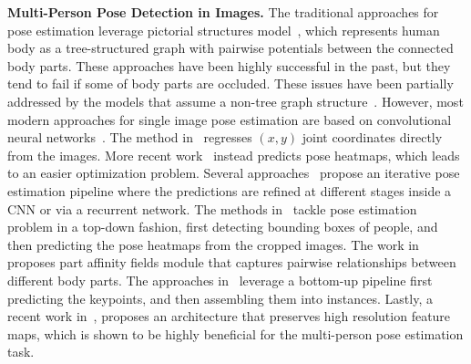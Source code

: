 \documentclass{article}
\begin{document}
\textbf{Multi-Person Pose Detection in Images.} The traditional approaches for pose estimation leverage pictorial structures model~\cite{conf/cvpr/AndrilukaRS09,5540156,BMVC.24.12:abbreviated,DBLP:conf/iccv/PishchulinAGS13,YiYang:2011:APE:2191740.2192012}, which represents human body as a tree-structured graph with pairwise potentials between the connected body parts. These approaches have been highly successful in the past, but they tend to fail if some of body parts are occluded. These issues have been partially addressed by the models that assume a non-tree graph structure~\cite{DGLG13,1541292,Sigal:CVPR:2006,10.1007/978-3-540-88690-7_53}. However, most modern approaches for single image pose estimation are based on convolutional neural networks~\cite{DBLP:journals/corr/ToshevS13,he2017maskrcnn,xiao2018simple,cao2017realtime,DBLP:conf/eccv/NewellYD16,DBLP:conf/cvpr/WeiRKS16,sun2019deep,7780881,NIPS2014_5291,6909696,insafutdinov2016deepercut,pishchulin16cvpr,NIPS2014_5573, DBLP:conf/cvpr/PapandreouZKTTB17}. The method in~\cite{DBLP:journals/corr/ToshevS13} regresses $(x,y)$ joint coordinates directly from the images. More recent work~\cite{DBLP:conf/eccv/NewellYD16} instead predicts pose heatmaps, which leads to an easier optimization problem. Several approaches~\cite{cao2017realtime,DBLP:conf/cvpr/WeiRKS16,7780881,Belagiannis17} propose an iterative pose estimation pipeline where the predictions are refined at different stages inside a CNN or via a recurrent network. The methods in~\cite{he2017maskrcnn,xiao2018simple,DBLP:conf/cvpr/PapandreouZKTTB17} tackle pose estimation problem in a top-down fashion, first detecting bounding boxes of people, and then predicting the pose heatmaps from the cropped images. The work in~\cite{cao2017realtime} proposes part affinity fields module that captures pairwise relationships between different body parts. The approaches in~\cite{insafutdinov2016deepercut,pishchulin16cvpr} leverage a bottom-up pipeline first predicting the keypoints, and then assembling them into instances. Lastly, a recent work in~\cite{sun2019deep}, proposes an architecture that preserves high resolution feature maps, which is shown to be highly beneficial for the multi-person pose estimation task. 
\end{document}
